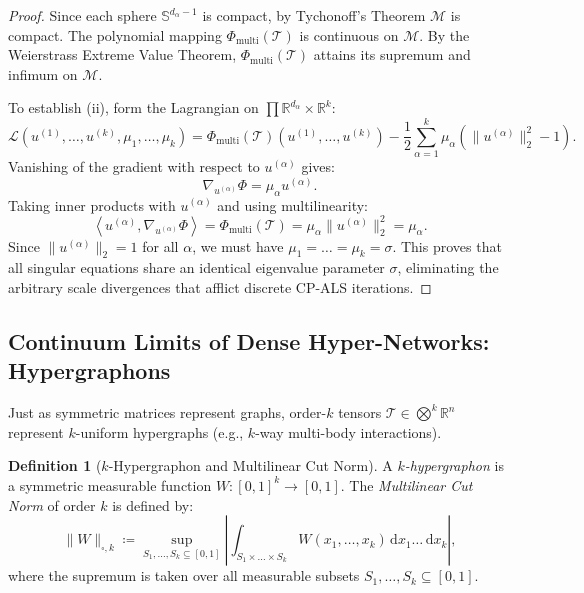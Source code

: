 \documentclass[11pt,a4paper,reqno]{amsart}
\theoremstyle{definition}
\newtheorem{definition}[theorem]{Definition}
\numberwithin{equation}{section}
\providecommand{\R}{\mathbb{R}}
\providecommand{\Sph}{\mathbb{S}}
\newcommand{\inner}[2]{\left\langle #1, #2 \right\rangle}
\newcommand{\dif}{\,\mathrm{d}}
\providecommand{\Sph}{\mathbb{S}}
\providecommand{\R}{\mathbb{R}}
\begin{document}
\begin{proof}
Since each sphere $\Sph^{d_\alpha - 1}$ is compact, by Tychonoff's Theorem $\mathcal{M}$ is compact. The polynomial mapping $\Phi_{\mathrm{multi}}(\mathcal{T})$ is continuous on $\mathcal{M}$. By the Weierstrass Extreme Value Theorem, $\Phi_{\mathrm{multi}}(\mathcal{T})$ attains its supremum and infimum on $\mathcal{M}$. 

To establish (ii), form the Lagrangian on $\prod \R^{d_\alpha} \times \R^k$:
\begin{equation}
    \mathcal{L}(u^{(1)}, \dots, u^{(k)}, \mu_1, \dots, \mu_k) = \Phi_{\mathrm{multi}}(\mathcal{T})(u^{(1)}, \dots, u^{(k)}) - \frac{1}{2} \sum_{\alpha=1}^k \mu_\alpha (\|u^{(\alpha)}\|_2^2 - 1).
\end{equation}
Vanishing of the gradient with respect to $u^{(\alpha)}$ gives:
\begin{equation}
    \nabla_{u^{(\alpha)}} \Phi = \mu_\alpha u^{(\alpha)}.
\end{equation}
Taking inner products with $u^{(\alpha)}$ and using multilinearity:
\begin{equation}
    \inner{u^{(\alpha)}}{\nabla_{u^{(\alpha)}} \Phi} = \Phi_{\mathrm{multi}}(\mathcal{T}) = \mu_\alpha \|u^{(\alpha)}\|_2^2 = \mu_\alpha.
\end{equation}
Since $\|u^{(\alpha)}\|_2 = 1$ for all $\alpha$, we must have $\mu_1 = \dots = \mu_k = \sigma$. This proves that all singular equations share an identical eigenvalue parameter $\sigma$, eliminating the arbitrary scale divergences that afflict discrete CP-ALS iterations.
\end{proof}

\subsection{Continuum Limits of Dense Hyper-Networks: Hypergraphons}
\label{subsec:hypergraphons}

Just as symmetric matrices represent graphs, order-$k$ tensors $\mathcal{T} \in \bigotimes^k \R^n$ represent $k$-uniform hypergraphs (e.g., $k$-way multi-body interactions).

\begin{definition}[$k$-Hypergraphon and Multilinear Cut Norm]
A \emph{$k$-hypergraphon} is a symmetric measurable function $W \colon [0, 1]^k \to [0, 1]$. The \emph{Multilinear Cut Norm} of order $k$ is defined by:
\begin{equation}
    \label{eq:hypergraphon_cutnorm}
    \|W\|_{\square, k} \coloneqq \sup_{S_1, \dots, S_k \subseteq [0, 1]} \left| \int_{S_1 \times \dots \times S_k} W(x_1, \dots, x_k) \dif x_1 \dots \dif x_k \right|,
\end{equation}
where the supremum is taken over all measurable subsets $S_1, \dots, S_k \subseteq [0, 1]$.
\end{definition}
\end{document}
